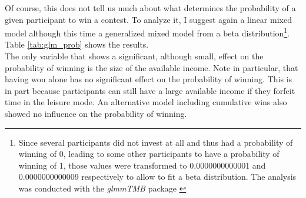 Of course, this does not tell us much about what determines the probability of a given participant to win a contest. To analyze it, I suggest again a linear mixed model although this time a generalized mixed model from a beta distribution\footnote{Since several participants did not invest at all and thus had a probability of winning of 0, leading to some other participants to have a probability of winning of 1, those values were transformed to 0.0000000000001 and 0.0000000000009 respectively to allow to fit a beta distribution. The analysis was conducted with the \textit{glmmTMB} package \citep{brooks2017}}. Table \ref{tab:glm_prob} shows the results.\\

The only variable that shows a significant, although small, effect on the probability of winning is the size of the available income. Note in particular, that having won alone has no significant effect on the probability of winning. This is in part because participants can still have a large available income if they forfeit time in the leisure mode. An alternative model including cumulative wins also showed no influence on the probability of winning.\\

